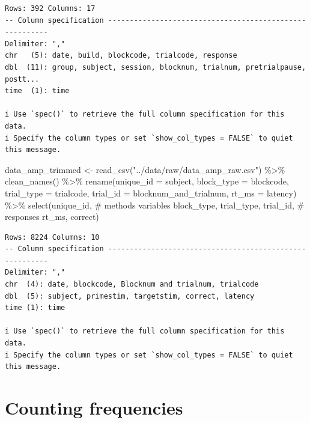 \documentclass[
  letterpaper,
  DIV=11,
  numbers=noendperiod]{scrreprt}
\newenvironment{Shaded}{\begin{snugshade}}{\end{snugshade}}
\newcommand{\AttributeTok}[1]{\textcolor[rgb]{0.40,0.45,0.13}{#1}}
\newcommand{\CommentTok}[1]{\textcolor[rgb]{0.37,0.37,0.37}{#1}}
\newcommand{\FunctionTok}[1]{\textcolor[rgb]{0.28,0.35,0.67}{#1}}
\newcommand{\NormalTok}[1]{\textcolor[rgb]{0.00,0.23,0.31}{#1}}
\newcommand{\OtherTok}[1]{\textcolor[rgb]{0.00,0.23,0.31}{#1}}
\newcommand{\SpecialCharTok}[1]{\textcolor[rgb]{0.37,0.37,0.37}{#1}}
\newcommand{\StringTok}[1]{\textcolor[rgb]{0.13,0.47,0.30}{#1}}
\begin{document}
\begin{verbatim}
Rows: 392 Columns: 17
-- Column specification --------------------------------------------------------
Delimiter: ","
chr   (5): date, build, blockcode, trialcode, response
dbl  (11): group, subject, session, blocknum, trialnum, pretrialpause, postt...
time  (1): time

i Use `spec()` to retrieve the full column specification for this data.
i Specify the column types or set `show_col_types = FALSE` to quiet this message.
\end{verbatim}

\begin{Shaded}
\begin{Highlighting}[]
\NormalTok{data\_amp\_trimmed }\OtherTok{\textless{}{-}} 
  \FunctionTok{read\_csv}\NormalTok{(}\StringTok{"../data/raw/data\_amp\_raw.csv"}\NormalTok{) }\SpecialCharTok{\%\textgreater{}\%}
  \FunctionTok{clean\_names}\NormalTok{() }\SpecialCharTok{\%\textgreater{}\%}
  \FunctionTok{rename}\NormalTok{(}\AttributeTok{unique\_id =}\NormalTok{ subject,}
         \AttributeTok{block\_type =}\NormalTok{ blockcode,}
         \AttributeTok{trial\_type =}\NormalTok{ trialcode,}
         \AttributeTok{trial\_id =}\NormalTok{ blocknum\_and\_trialnum,}
         \AttributeTok{rt\_ms =}\NormalTok{ latency) }\SpecialCharTok{\%\textgreater{}\%}
  \FunctionTok{select}\NormalTok{(unique\_id, }
         \CommentTok{\# methods variables}
\NormalTok{         block\_type,}
\NormalTok{         trial\_type,}
\NormalTok{         trial\_id,}
         \CommentTok{\# responses }
\NormalTok{         rt\_ms, }
\NormalTok{         correct)}
\end{Highlighting}
\end{Shaded}

\begin{verbatim}
Rows: 8224 Columns: 10
-- Column specification --------------------------------------------------------
Delimiter: ","
chr  (4): date, blockcode, Blocknum and trialnum, trialcode
dbl  (5): subject, primestim, targetstim, correct, latency
time (1): time

i Use `spec()` to retrieve the full column specification for this data.
i Specify the column types or set `show_col_types = FALSE` to quiet this message.
\end{verbatim}

\section{Counting frequencies}\label{counting-frequencies}
\end{document}
